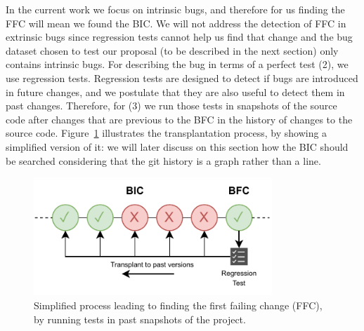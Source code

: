 In the current work we focus on intrinsic bugs, and therefore for us finding the FFC will mean we found the BIC.
We will not address the detection of FFC in extrinsic bugs since regression tests cannot help us find that change and the bug dataset chosen to test our proposal (to be described in the next section) only contains intrinsic bugs.
For describing the bug in terms of a perfect test (2), we use regression tests. Regression tests are designed to detect if bugs are introduced in future changes, and we postulate that they are also useful to detect them in past changes.
Therefore, for (3) we run those tests in snapshots of the source code after changes that are previous to the BFC  in the history of changes to the source code. 
Figure~\ref{fig:process} illustrates the transplantation process, by showing a simplified version of it: we will later discuss on this section how the BIC should be searched considering that the git history is a graph rather than a line.

\begin{figure}[h!]
  \centering    
  \includegraphics[width=0.8\textwidth]{pages/03-BugHunter/images/Model_Inverted.pdf}
  \vspace{-0.5cm}
  \caption{Simplified process leading to finding the first failing change (FFC), by running tests in past snapshots of the project.}
  \label{fig:process}
\end{figure}

